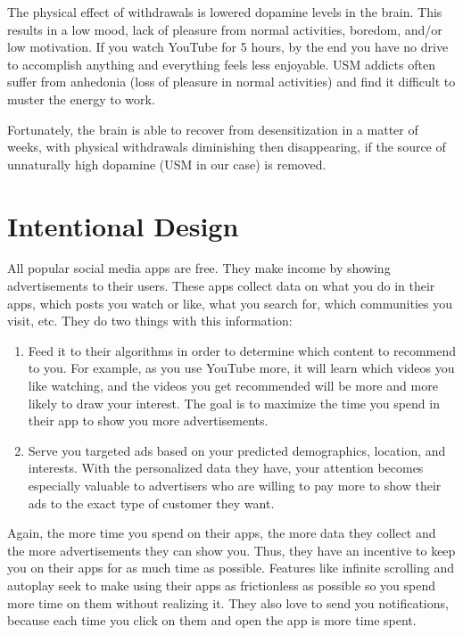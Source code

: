 \documentclass[
]{book}
\providecommand{\tightlist}{%
  \setlength{\itemsep}{0pt}\setlength{\parskip}{0pt}}
\begin{document}
The physical effect of withdrawals is lowered dopamine levels in the brain. This results in a low mood, lack of pleasure from normal activities, boredom, and/or low motivation. If you watch YouTube for 5 hours, by the end you have no drive to accomplish anything and everything feels less enjoyable. USM addicts often suffer from anhedonia (loss of pleasure in normal activities) and find it difficult to muster the energy to work.

Fortunately, the brain is able to recover from desensitization in a matter of weeks, with physical withdrawals diminishing then disappearing, if the source of unnaturally high dopamine (USM in our case) is removed.

\section{Intentional Design}\label{intentional-design}

All popular social media apps are free. They make income by showing advertisements to their users. These apps collect data on what you do in their apps, which posts you watch or like, what you search for, which communities you visit, etc. They do two things with this information:

\begin{enumerate}
\def\labelenumi{\arabic{enumi}.}
\tightlist
\item
  Feed it to their algorithms in order to determine which content to recommend to you. For example, as you use YouTube more, it will learn which videos you like watching, and the videos you get recommended will be more and more likely to draw your interest. The goal is to maximize the time you spend in their app to show you more advertisements.
\item
  Serve you targeted ads based on your predicted demographics, location, and interests. With the personalized data they have, your attention becomes especially valuable to advertisers who are willing to pay more to show their ads to the exact type of customer they want.
\end{enumerate}

Again, the more time you spend on their apps, the more data they collect and the more advertisements they can show you. Thus, they have an incentive to keep you on their apps for as much time as possible. Features like infinite scrolling and autoplay seek to make using their apps as frictionless as possible so you spend more time on them without realizing it. They also love to send you notifications, because each time you click on them and open the app is more time spent.
\end{document}
